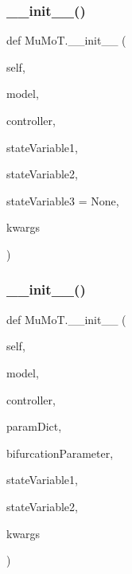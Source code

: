 \subsubsection{\texorpdfstring{\+\_\+\+\_\+init\+\_\+\+\_\+()}{\_\_init\_\_()}\hspace{0.1cm}{\footnotesize\ttfamily [5/6]}}
{\footnotesize\ttfamily def Mu\+Mo\+T.\+\_\+\+\_\+init\+\_\+\+\_\+ (\begin{DoxyParamCaption}\item[{}]{self,  }\item[{}]{model,  }\item[{}]{controller,  }\item[{}]{state\+Variable1,  }\item[{}]{state\+Variable2,  }\item[{}]{state\+Variable3 = {\ttfamily None},  }\item[{}]{kwargs }\end{DoxyParamCaption})}

\mbox{\label{namespace_mu_mo_t_a924dff9dd4d6ae1243a437a1bab2e368}} 
\subsubsection{\texorpdfstring{\+\_\+\+\_\+init\+\_\+\+\_\+()}{\_\_init\_\_()}\hspace{0.1cm}{\footnotesize\ttfamily [6/6]}}
{\footnotesize\ttfamily def Mu\+Mo\+T.\+\_\+\+\_\+init\+\_\+\+\_\+ (\begin{DoxyParamCaption}\item[{}]{self,  }\item[{}]{model,  }\item[{}]{controller,  }\item[{}]{param\+Dict,  }\item[{}]{bifurcation\+Parameter,  }\item[{}]{state\+Variable1,  }\item[{}]{state\+Variable2,  }\item[{}]{kwargs }\end{DoxyParamCaption})}

\mbox{\label{namespace_mu_mo_t_abbce630249f9f7985fe5fb4a46ddbe60}} 
